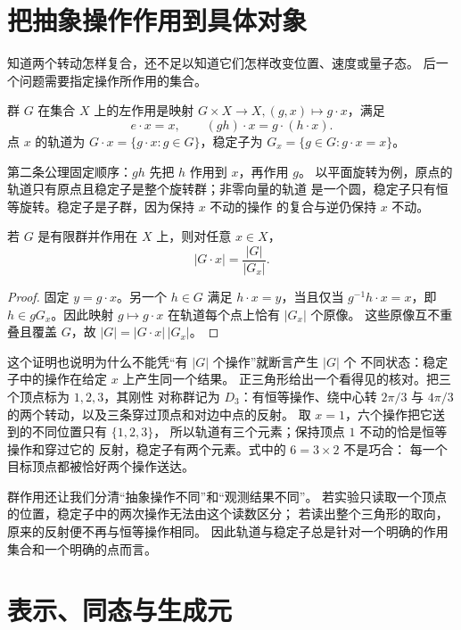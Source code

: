\section{把抽象操作作用到具体对象}

知道两个转动怎样复合，还不足以知道它们怎样改变位置、速度或量子态。
后一个问题需要指定操作所作用的集合。
\begin{definition}[群作用]
群 \(G\) 在集合 \(X\) 上的左作用是映射
\(G\times X\to X,(g,x)\mapsto g\cdot x\)，满足
\[
e\cdot x=x,\qquad (gh)\cdot x=g\cdot(h\cdot x).
\]
点 \(x\) 的轨道为 \(G\cdot x=\{g\cdot x:g\in G\}\)，稳定子为
\(G_x=\{g\in G:g\cdot x=x\}\)。
\end{definition}

第二条公理固定顺序：\(gh\) 先把 \(h\) 作用到 \(x\)，再作用 \(g\)。
以平面旋转为例，原点的轨道只有原点且稳定子是整个旋转群；非零向量的轨道
是一个圆，稳定子只有恒等旋转。稳定子是子群，因为保持 \(x\) 不动的操作
的复合与逆仍保持 \(x\) 不动。

\begin{theorem}[轨道与稳定子的计数]
若 \(G\) 是有限群并作用在 \(X\) 上，则对任意 \(x\in X\)，
\[
|G\cdot x|=\frac{|G|}{|G_x|}.
\]
\end{theorem}
\begin{proof}
固定 \(y=g\cdot x\)。另一个 \(h\in G\) 满足 \(h\cdot x=y\)，当且仅当
\(g^{-1}h\cdot x=x\)，即 \(h\in gG_x\)。因此映射
\(g\mapsto g\cdot x\) 在轨道每个点上恰有 \(|G_x|\) 个原像。
这些原像互不重叠且覆盖 \(G\)，故 \(|G|=|G\cdot x|\,|G_x|\)。
\end{proof}

这个证明也说明为什么不能凭“有 \(|G|\) 个操作”就断言产生 \(|G|\) 个
不同状态：稳定子中的操作在给定 \(x\) 上产生同一个结果。
正三角形给出一个看得见的核对。把三个顶点标为 \(1,2,3\)，其刚性
对称群记为 \(D_3\)：有恒等操作、绕中心转 \(2\pi/3\) 与
\(4\pi/3\) 的两个转动，以及三条穿过顶点和对边中点的反射。
取 \(x=1\)，六个操作把它送到的不同位置只有 \(\{1,2,3\}\)，
所以轨道有三个元素；保持顶点 \(1\) 不动的恰是恒等操作和穿过它的
反射，稳定子有两个元素。式中的 \(6=3\times2\) 不是巧合：
每一个目标顶点都被恰好两个操作送达。

群作用还让我们分清“抽象操作不同”和“观测结果不同”。
若实验只读取一个顶点的位置，稳定子中的两次操作无法由这个读数区分；
若读出整个三角形的取向，原来的反射便不再与恒等操作相同。
因此轨道与稳定子总是针对一个明确的作用集合和一个明确的点而言。

\section{表示、同态与生成元}

